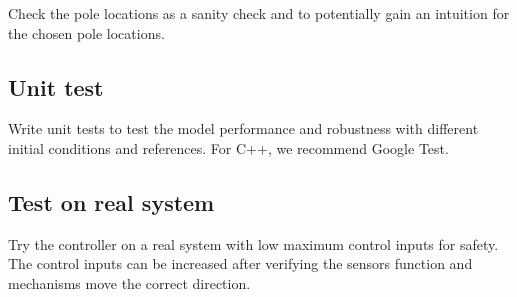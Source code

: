 Check the pole locations as a sanity check and to potentially gain an intuition
for the chosen pole locations.

\subsection{Unit test}

Write unit tests to test the \gls{model} performance and \gls{robustness} with
different initial conditions and \glspl{reference}. For C++, we recommend Google
Test.

\subsection{Test on real system}

Try the controller on a real \gls{system} with low maximum \glspl{control input}
for safety. The \glspl{control input} can be increased after verifying the
sensors function and mechanisms move the correct direction.
